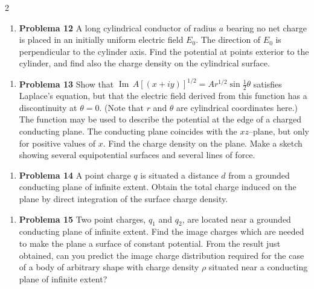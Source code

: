 \documentclass{article}
\begin{document}
\begin{multicols}{2}
\begin{enumerate}[label={{\textcolor{trueblue}{\textbf{Pr.} \arabic*.12}}}, start=3]
\item \textbf{Problema 12} A long cylindrical conductor of radius $a$ bearing no net charge is placed in an initially uniform electric field $E_{0}$. The direction of $E_{0}$ is perpendicular to the cylinder axis. Find the potential at points exterior to the cylinder, and find also the charge density on the cylindrical surface.
\end{enumerate}

\begin{enumerate}[label={{\textcolor{trueblue}{\textbf{Pr.} \arabic*.13}}}, start=3]
\item \textbf{Problema 13} Show that $\operatorname{Im}\,A[(x + i y)]^{1/2} = A r^{1/2} \sin \tfrac{1}{2}\theta$ satisfies Laplace’s equation, but that the electric field derived from this function has a discontinuity at $\theta = 0$. (Note that $r$ and $\theta$ are cylindrical coordinates here.) The function may be used to describe the potential at the edge of a charged conducting plane. The conducting plane coincides with the $xz$–plane, but only for positive values of $x$. Find the charge density on the plane. Make a sketch showing several equipotential surfaces and several lines of force.
\end{enumerate}

\begin{enumerate}[label={{\textcolor{trueblue}{\textbf{Pr.} \arabic*.14}}}, start=3]
\item \textbf{Problema 14} A point charge $q$ is situated a distance $d$ from a grounded conducting plane of infinite extent. Obtain the total charge induced on the plane by direct integration of the surface charge density.
\end{enumerate}

\begin{enumerate}[label={{\textcolor{trueblue}{\textbf{Pr.} \arabic*.15}}}, start=3]
\item \textbf{Problema 15} Two point charges, $q_{1}$ and $q_{2}$, are located near a grounded conducting plane of infinite extent. Find the image charges which are needed to make the plane a surface of constant potential. From the result just obtained, can you predict the image charge distribution required for the case of a body of arbitrary shape with charge density $\rho$ situated near a conducting plane of infinite extent?
\end{enumerate}


\end{multicols}
\end{document}
